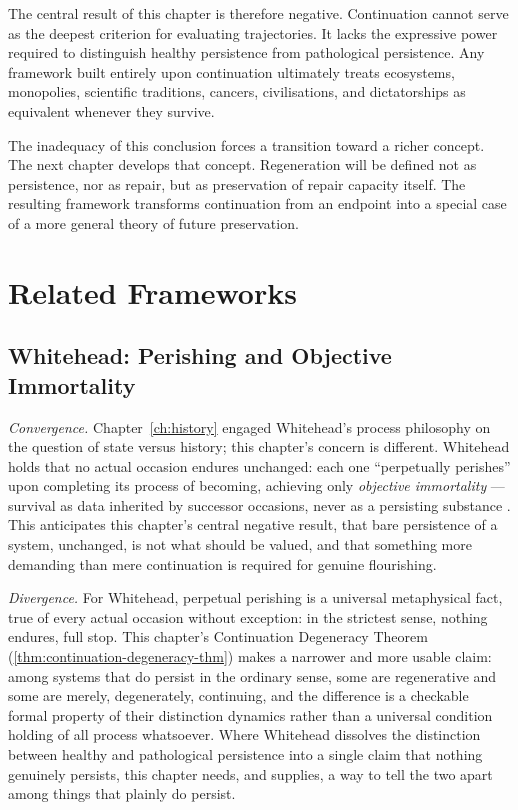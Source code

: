 \documentclass[12pt,twoside,openright]{book}
\begin{document}
The central result of this chapter is therefore negative.
Continuation cannot serve as the deepest criterion for
evaluating trajectories. It lacks the expressive power
required to distinguish healthy persistence from
pathological persistence. Any framework built entirely upon
continuation ultimately treats ecosystems, monopolies,
scientific traditions, cancers, civilisations, and
dictatorships as equivalent whenever they survive.

The inadequacy of this conclusion forces a transition
toward a richer concept. The next chapter develops that
concept. Regeneration will be defined not as persistence,
nor as repair, but as preservation of repair capacity
itself. The resulting framework transforms continuation
from an endpoint into a special case of a more general
theory of future preservation.

\section{Related Frameworks}
\label{sec:ch10-related-frameworks}

\subsection*{Whitehead: Perishing and Objective Immortality}

\emph{Convergence.} Chapter~\ref{ch:history} engaged Whitehead's
process philosophy on the question of state versus history; this
chapter's concern is different. Whitehead holds that no actual
occasion endures unchanged: each one ``perpetually perishes''
upon completing its process of becoming, achieving only
\emph{objective immortality} --- survival as data inherited by
successor occasions, never as a persisting substance
\parencite{whitehead1929}. This anticipates this chapter's
central negative result, that bare persistence of a system,
unchanged, is not what should be valued, and that something more
demanding than mere continuation is required for genuine
flourishing.

\emph{Divergence.} For Whitehead, perpetual perishing is a
universal metaphysical fact, true of every actual occasion
without exception: in the strictest sense, nothing endures, full
stop. This chapter's Continuation Degeneracy Theorem
(\cref{thm:continuation-degeneracy-thm}) makes a narrower and
more usable claim: among systems that do persist in the ordinary
sense, some are regenerative and some are merely, degenerately,
continuing, and the difference is a checkable formal property of
their distinction dynamics rather than a universal condition
holding of all process whatsoever. Where Whitehead dissolves the
distinction between healthy and pathological persistence into a
single claim that nothing genuinely persists, this chapter needs,
and supplies, a way to tell the two apart among things that
plainly do persist.
\end{document}
